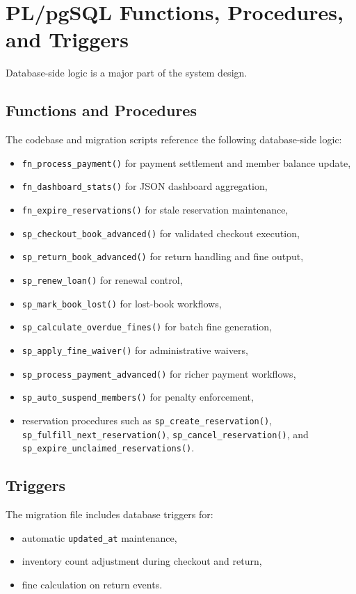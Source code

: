 \documentclass[12pt,a4paper]{report}
\begin{document}
\section{PL/pgSQL Functions, Procedures, and Triggers}
Database-side logic is a major part of the system design.

\subsection{Functions and Procedures}
The codebase and migration scripts reference the following database-side logic:
\begin{itemize}[leftmargin=1.5em]
    \item \texttt{fn\_process\_payment()} for payment settlement and member balance update,
    \item \texttt{fn\_dashboard\_stats()} for JSON dashboard aggregation,
    \item \texttt{fn\_expire\_reservations()} for stale reservation maintenance,
    \item \texttt{sp\_checkout\_book\_advanced()} for validated checkout execution,
    \item \texttt{sp\_return\_book\_advanced()} for return handling and fine output,
    \item \texttt{sp\_renew\_loan()} for renewal control,
    \item \texttt{sp\_mark\_book\_lost()} for lost-book workflows,
    \item \texttt{sp\_calculate\_overdue\_fines()} for batch fine generation,
    \item \texttt{sp\_apply\_fine\_waiver()} for administrative waivers,
    \item \texttt{sp\_process\_payment\_advanced()} for richer payment workflows,
    \item \texttt{sp\_auto\_suspend\_members()} for penalty enforcement,
    \item reservation procedures such as \texttt{sp\_create\_reservation()}, \texttt{sp\_fulfill\_next\_reservation()}, \texttt{sp\_cancel\_reservation()}, and \texttt{sp\_expire\_unclaimed\_reservations()}.
\end{itemize}

\subsection{Triggers}
The migration file includes database triggers for:
\begin{itemize}[leftmargin=1.5em]
    \item automatic \texttt{updated\_at} maintenance,
    \item inventory count adjustment during checkout and return,
    \item fine calculation on return events.
\end{itemize}
\end{document}
